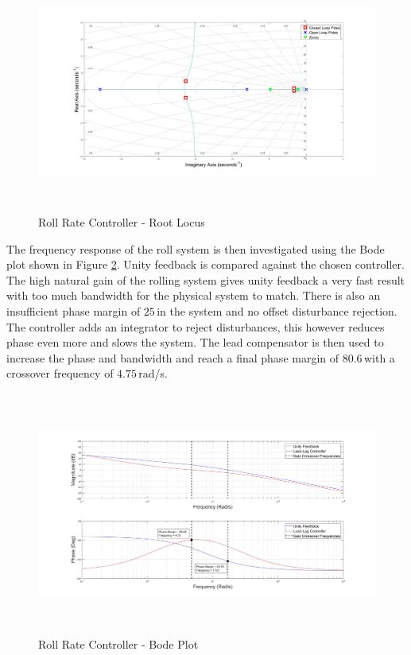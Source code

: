 \documentclass[12pt]{report}
\begin{document}
\begin{figure}[H]
	\centering
	\includegraphics[height = 8cm]{../Design/Matlab/Controllers/roll_rate_root.jpg}
	\caption{Roll Rate Controller -  Root Locus}
	\label{IM_RollRateControlRoot}
\end{figure}

The frequency response of the roll system is then investigated using the Bode plot shown in Figure \ref{IM_RollRateControlBode}. Unity feedback is compared against the chosen controller. The high natural gain of the rolling system gives unity feedback a very fast result with too much bandwidth for the physical system to match. There is also an insufficient phase margin of $25$\textdegree\,in the system and no offset disturbance rejection. The controller adds an integrator to reject disturbances, this however reduces phase even more and slows the system. The lead compensator is then used to increase the phase and bandwidth and reach a final phase margin of $80.6$\textdegree\,with a crossover frequency of $4.75$\,rad/s.

\begin{figure}[H]
	\centering
	\includegraphics[height = 8cm]{../Design/Matlab/Controllers/roll_rate_bode.jpg}
	\caption{Roll Rate Controller -  Bode Plot}
	\label{IM_RollRateControlBode}
\end{figure}
\end{document}
